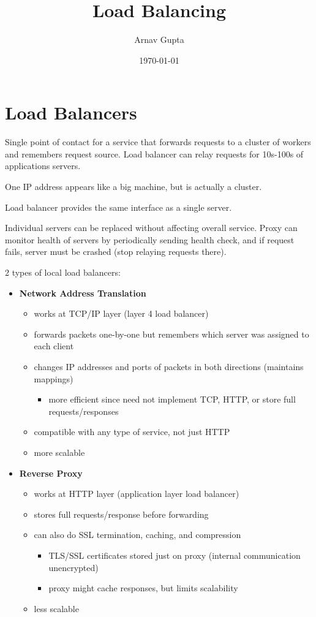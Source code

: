 \documentclass[11pt]{article}
\author{Arnav Gupta}
\date{\today}
\title{Load Balancing}
\begin{document}
\maketitle
\tableofcontents

\section{Load Balancers}
\label{sec:orgb83b1c3}
Single point of contact for a service that forwards requests to a cluster of workers and remembers
request source.
Load balancer can relay requests for 10s-100s of applications servers.

One IP address appears like a big machine, but is actually a cluster.

Load balancer provides the same interface as a single server.

Individual servers can be replaced without affecting overall service.
Proxy can monitor health of servers by periodically sending health check, and if
request fails, server must be crashed (stop relaying requests there).

2 types of local load balancers:
\begin{itemize}
\item \textbf{Network Address Translation}
\begin{itemize}
\item works at TCP/IP layer (layer 4 load balancer)
\item forwards packets one-by-one but remembers which server was assigned to each client
\item changes IP addresses and ports of packets in both directions (maintains mappings)
\begin{itemize}
\item more efficient since need not implement TCP, HTTP, or store full requests/responses
\end{itemize}
\item compatible with any type of service, not just HTTP
\item more scalable
\end{itemize}
\item \textbf{Reverse Proxy}
\begin{itemize}
\item works at HTTP layer (application layer load balancer)
\item stores full requests/response before forwarding
\item can also do SSL termination, caching, and compression
\begin{itemize}
\item TLS/SSL certificates stored just on proxy (internal communication unencrypted)
\item proxy might cache responses, but limits scalability
\end{itemize}
\item less scalable
\end{itemize}
\end{itemize}
\end{document}
